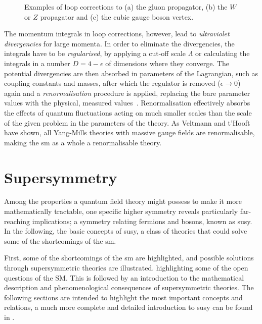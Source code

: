 \begin{figure}
\begin{subfigure}[b]{0.33\linewidth}
		\caption{\label{fig:cubic_vertex}}
	\end{subfigure}
	\caption{Examples of loop corrections to (a) the gluon propagator, (b) the $W$ or $Z$ propagator and (c) the cubic gauge boson vertex.}\label{fig:loop_corrections}
\end{figure}

The momentum integrals in loop corrections, however, lead to \textit{ultraviolet divergencies} for large momenta. In order to eliminate the divergencies, the integrals have to be \textit{regularised}, \eg by applying a cut-off scale $\Lambda$ or calculating the integrals in a number $D = 4-\epsilon$ of dimensions where they converge. The potential divergencies are then absorbed in parameters of the Lagrangian, such as coupling constants and masses, after which the regulator is removed (\eg $\epsilon\rightarrow 0$) again and a \textit{renormalisation} procedure is applied, replacing the bare parameter values with the physical, measured values~\cite{Brock:1354959}. Renormalisation effectively absorbs the effects of quantum fluctuations acting on much smaller scales than the scale of the given problem in the parameters of the theory.
As Veltmann and t'Hooft~\cite{THOOFT1972189,THOOFT1971173} have shown, all Yang-Mills theories with massive gauge fields are renormalisable, making the \gls{sm} as a whole a renormalisable theory.  

\section{Supersymmetry}

Among the properties a quantum field theory might possess to make it more mathematically tractable, one specific higher symmetry reveals particularly far-reaching implications; a symmetry relating fermions and bosons, known as \gls{susy}. In the following, the basic concepts of \gls{susy}, a class of theories that could solve some of the shortcomings of the \gls{sm}. 

First, some of the shortcomings of the \gls{sm} are highlighted, and possible solutions through supersymmetric theories are illustrated.  highlighting some of the open questions of the SM. This is followed by an introduction to the mathematical description and phenomenological consequences of supersymmetric theories. The following sections are intended to highlight the most important concepts and relations, a much more complete and detailed introduction to \gls{susy} can be found in \cite{Martin:1997ns,Bustamante:2009us}.

